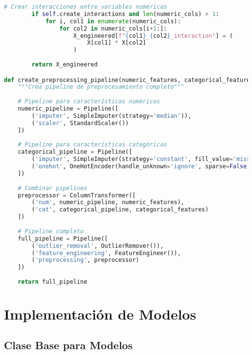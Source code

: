 \begin{lstlisting}[language=Python, caption=Pipeline de preprocesamiento modular]
        # Crear interacciones entre variables numéricas
        if self.create_interactions and len(numeric_cols) > 1:
            for i, col1 in enumerate(numeric_cols):
                for col2 in numeric_cols[i+1:]:
                    X_engineered[f"{col1}_{col2}_interaction"] = (
                        X[col1] * X[col2]
                    )
        
        return X_engineered

def create_preprocessing_pipeline(numeric_features, categorical_features):
    """Crea pipeline de preprocesamiento completo"""
    
    # Pipeline para características numéricas
    numeric_pipeline = Pipeline([
        ('imputer', SimpleImputer(strategy='median')),
        ('scaler', StandardScaler())
    ])
    
    # Pipeline para características categóricas
    categorical_pipeline = Pipeline([
        ('imputer', SimpleImputer(strategy='constant', fill_value='missing')),
        ('onehot', OneHotEncoder(handle_unknown='ignore', sparse=False))
    ])
    
    # Combinar pipelines
    preprocessor = ColumnTransformer([
        ('num', numeric_pipeline, numeric_features),
        ('cat', categorical_pipeline, categorical_features)
    ])
    
    # Pipeline completo
    full_pipeline = Pipeline([
        ('outlier_removal', OutlierRemover()),
        ('feature_engineering', FeatureEngineer()),
        ('preprocessing', preprocessor)
    ])
    
    return full_pipeline
\end{lstlisting}

\section{Implementación de Modelos}

\subsection{Clase Base para Modelos}

